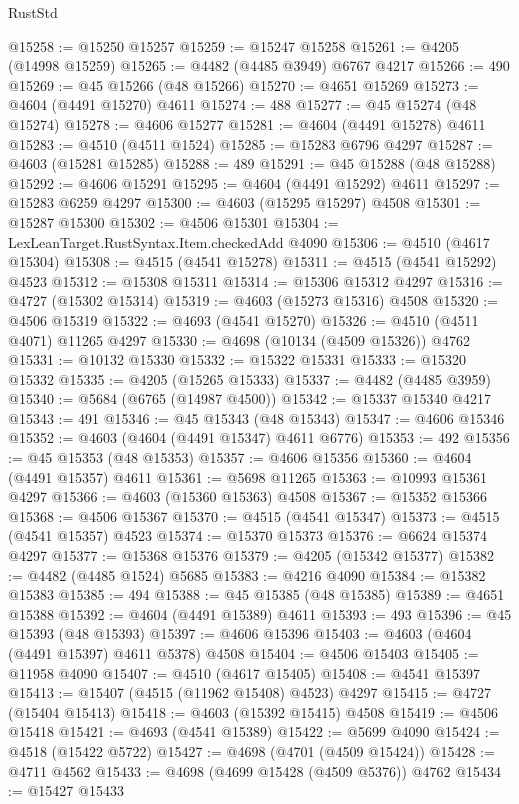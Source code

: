 \begin{lexlean}{RustStd}
\begin{coremodule}
@15258 := @15250 @15257
@15259 := @15247 @15258
@15261 := @4205 (@14998 @15259)
@15265 := @4482 (@4485 @3949) @6767 @4217
@15266 := 490
@15269 := @45 @15266 (@48 @15266)
@15270 := @4651 @15269
@15273 := @4604 (@4491 @15270) @4611
@15274 := 488
@15277 := @45 @15274 (@48 @15274)
@15278 := @4606 @15277
@15281 := @4604 (@4491 @15278) @4611
@15283 := @4510 (@4511 @1524)
@15285 := @15283 @6796 @4297
@15287 := @4603 (@15281 @15285)
@15288 := 489
@15291 := @45 @15288 (@48 @15288)
@15292 := @4606 @15291
@15295 := @4604 (@4491 @15292) @4611
@15297 := @15283 @6259 @4297
@15300 := @4603 (@15295 @15297) @4508
@15301 := @15287 @15300
@15302 := @4506 @15301
@15304 := LexLeanTarget.RustSyntax.Item.checkedAdd @4090
@15306 := @4510 (@4617 @15304)
@15308 := @4515 (@4541 @15278)
@15311 := @4515 (@4541 @15292) @4523
@15312 := @15308 @15311
@15314 := @15306 @15312 @4297
@15316 := @4727 (@15302 @15314)
@15319 := @4603 (@15273 @15316) @4508
@15320 := @4506 @15319
@15322 := @4693 (@4541 @15270)
@15326 := @4510 (@4511 @4071) @11265 @4297
@15330 := @4698 (@10134 (@4509 @15326)) @4762
@15331 := @10132 @15330
@15332 := @15322 @15331
@15333 := @15320 @15332
@15335 := @4205 (@15265 @15333)
@15337 := @4482 (@4485 @3959)
@15340 := @5684 (@6765 (@14987 @4500))
@15342 := @15337 @15340 @4217
@15343 := 491
@15346 := @45 @15343 (@48 @15343)
@15347 := @4606 @15346
@15352 := @4603 (@4604 (@4491 @15347) @4611 @6776)
@15353 := 492
@15356 := @45 @15353 (@48 @15353)
@15357 := @4606 @15356
@15360 := @4604 (@4491 @15357) @4611
@15361 := @5698 @11265
@15363 := @10993 @15361 @4297
@15366 := @4603 (@15360 @15363) @4508
@15367 := @15352 @15366
@15368 := @4506 @15367
@15370 := @4515 (@4541 @15347)
@15373 := @4515 (@4541 @15357) @4523
@15374 := @15370 @15373
@15376 := @6624 @15374 @4297
@15377 := @15368 @15376
@15379 := @4205 (@15342 @15377)
@15382 := @4482 (@4485 @1524) @5685
@15383 := @4216 @4090
@15384 := @15382 @15383
@15385 := 494
@15388 := @45 @15385 (@48 @15385)
@15389 := @4651 @15388
@15392 := @4604 (@4491 @15389) @4611
@15393 := 493
@15396 := @45 @15393 (@48 @15393)
@15397 := @4606 @15396
@15403 := @4603 (@4604 (@4491 @15397) @4611 @5378) @4508
@15404 := @4506 @15403
@15405 := @11958 @4090
@15407 := @4510 (@4617 @15405)
@15408 := @4541 @15397
@15413 := @15407 (@4515 (@11962 @15408) @4523) @4297
@15415 := @4727 (@15404 @15413)
@15418 := @4603 (@15392 @15415) @4508
@15419 := @4506 @15418
@15421 := @4693 (@4541 @15389)
@15422 := @5699 @4090
@15424 := @4518 (@15422 @5722)
@15427 := @4698 (@4701 (@4509 @15424))
@15428 := @4711 @4562
@15433 := @4698 (@4699 @15428 (@4509 @5376)) @4762
@15434 := @15427 @15433

\end{coremodule}
\end{lexlean}
